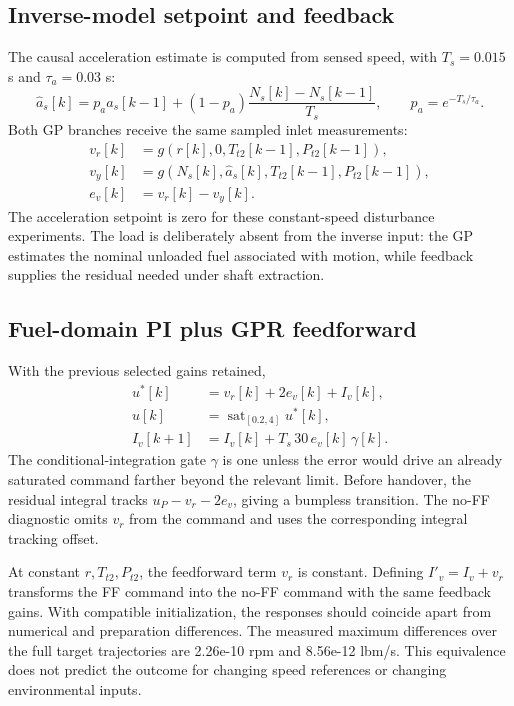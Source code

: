 \documentclass[11pt,a4paper]{article}
\begin{document}
\subsection{Inverse-model setpoint and feedback}
The causal acceleration estimate is computed from sensed speed, with $T_s=0.015$ s and $\tau_a=0.03$ s:
\begin{equation}
\hat a_s[k]=p_a\hat a_s[k-1]+(1-p_a)\frac{N_s[k]-N_s[k-1]}{T_s},\qquad p_a=e^{-T_s/\tau_a}.
\end{equation}
Both GP branches receive the same sampled inlet measurements:
\begin{align}
v_r[k]&=g(r[k],0,T_{t2}[k-1],P_{t2}[k-1]),\\
v_y[k]&=g(N_s[k],\hat a_s[k],T_{t2}[k-1],P_{t2}[k-1]),\\
e_v[k]&=v_r[k]-v_y[k].
\end{align}
The acceleration setpoint is zero for these constant-speed disturbance experiments. The load is deliberately absent from the inverse input: the GP estimates the nominal unloaded fuel associated with motion, while feedback supplies the residual needed under shaft extraction.

\subsection{Fuel-domain PI plus GPR feedforward}
With the previous selected gains retained,
\begin{align}
u^*[k]&=v_r[k]+2e_v[k]+I_v[k],\\
u[k]&=\operatorname{sat}_{[0.2,4]}u^*[k],\\
I_v[k+1]&=I_v[k]+T_s\,30\,e_v[k]\,\gamma[k].
\end{align}
The conditional-integration gate $\gamma$ is one unless the error would drive an already saturated command farther beyond the relevant limit. Before handover, the residual integral tracks $u_P-v_r-2e_v$, giving a bumpless transition. The no-FF diagnostic omits $v_r$ from the command and uses the corresponding integral tracking offset.

At constant $r,T_{t2},P_{t2}$, the feedforward term $v_r$ is constant. Defining $I'_v=I_v+v_r$ transforms the FF command into the no-FF command with the same feedback gains. With compatible initialization, the responses should coincide apart from numerical and preparation differences. The measured maximum differences over the full target trajectories are 2.26e-10 rpm and 8.56e-12 lbm/s. This equivalence does not predict the outcome for changing speed references or changing environmental inputs.
\end{document}
